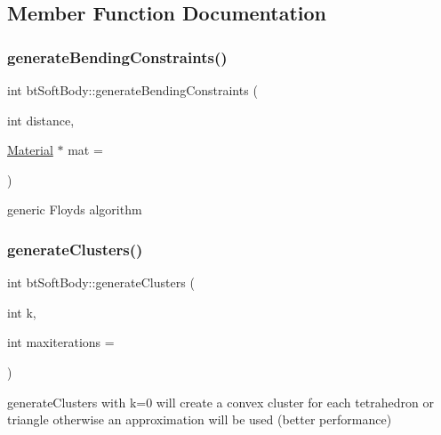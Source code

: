 \subsection{Member Function Documentation}
\mbox{\label{classbtSoftBody_af31b03f0ff5eecec1ec9eee5a7582d20}} 
\subsubsection{\texorpdfstring{generate\+Bending\+Constraints()}{generateBendingConstraints()}}
{\footnotesize\ttfamily int bt\+Soft\+Body\+::generate\+Bending\+Constraints (\begin{DoxyParamCaption}\item[{int}]{distance,  }\item[{\hyperlink{structbtSoftBody_1_1Material}{Material} $\ast$}]{mat = {} }\end{DoxyParamCaption})}

generic Floyd\textquotesingle{}s algorithm \mbox{\label{classbtSoftBody_a9915ca0d99dbeb9f39221dab218d5208}} 
\subsubsection{\texorpdfstring{generate\+Clusters()}{generateClusters()}}
{\footnotesize\ttfamily int bt\+Soft\+Body\+::generate\+Clusters (\begin{DoxyParamCaption}\item[{int}]{k,  }\item[{int}]{maxiterations = {} }\end{DoxyParamCaption})}

generate\+Clusters with k=0 will create a convex cluster for each tetrahedron or triangle otherwise an approximation will be used (better performance) \mbox{\label{classbtSoftBody_a71de05c3c56952a4d76e09ca9ca9cce0}} 
